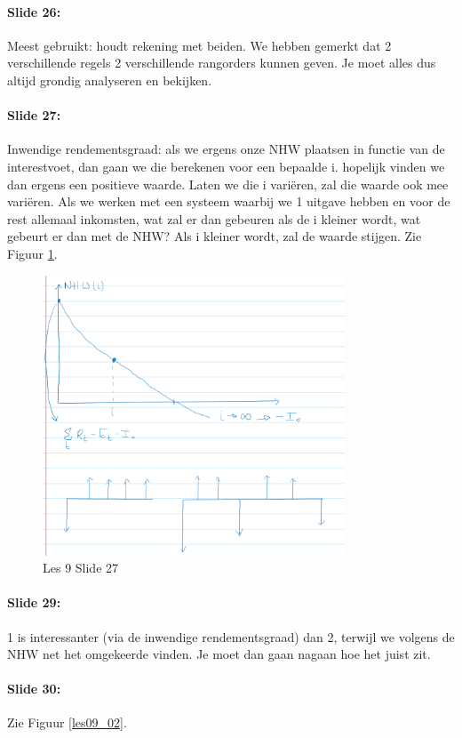 \documentclass[10pt,a4paper]{report}
\begin{document}
\paragraph{Slide 26:} Meest gebruikt: houdt rekening met beiden. We hebben gemerkt dat 2 verschillende regels 2 verschillende rangorders kunnen geven. Je moet alles dus altijd grondig analyseren en bekijken.

\paragraph{Slide 27:} Inwendige rendementsgraad: als we ergens onze NHW plaatsen in functie van de interestvoet, dan gaan we die berekenen voor een bepaalde i. hopelijk vinden we dan ergens een positieve waarde. Laten we die i vari\"eren, zal die waarde ook mee vari\"eren. Als we werken met een systeem waarbij we 1 uitgave hebben en voor de rest allemaal inkomsten, wat zal er dan gebeuren als de i kleiner wordt, wat gebeurt er dan met de NHW? Als i kleiner wordt, zal de waarde stijgen. Zie Figuur \ref{les09_01}.

\begin{figure}[h!]
\centering
\includegraphics[width=90mm]{Les09_01.png}
\caption{Les 9 Slide 27} 
\label{les09_01}
\end{figure}

\paragraph{Slide 29:} 1 is interessanter (via de inwendige rendementsgraad) dan 2, terwijl we volgens de NHW net het omgekeerde vinden. Je moet dan gaan nagaan hoe het juist zit. 

\paragraph{Slide 30:} Zie Figuur \ref{les09_02}.
\end{document}
